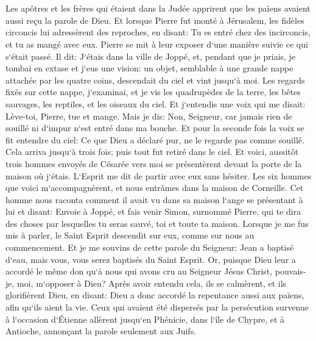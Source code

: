 \chapter{}

\verse Les apôtres et les frères qui étaient dans la Judée apprirent que les païens avaient aussi reçu la parole de Dieu. 
\verse Et lorsque Pierre fut monté à Jérusalem, les fidèles circoncis lui adressèrent des reproches, 
\verse en disant: Tu es entré chez des incirconcis, et tu as mangé avec eux. 
\verse Pierre se mit à leur exposer d`une manière suivie ce qui s`était passé. 
\verse Il dit: J`étais dans la ville de Joppé, et, pendant que je priais, je tombai en extase et j`eus une vision: un objet, semblable à une grande nappe attachée par les quatre coins, descendait du ciel et vint jusqu`à moi. 
\verse Les regards fixés sur cette nappe, j`examinai, et je vis les quadrupèdes de la terre, les bêtes sauvages, les reptiles, et les oiseaux du ciel. 
\verse Et j`entendis une voix qui me disait: Lève-toi, Pierre, tue et mange. 
\verse Mais je dis: Non, Seigneur, car jamais rien de souillé ni d`impur n`est entré dans ma bouche. 
\verse Et pour la seconde fois la voix se fit entendre du ciel: Ce que Dieu a déclaré pur, ne le regarde pas comme souillé. 
\verse Cela arriva jusqu`à trois fois; puis tout fut retiré dans le ciel. 
\verse Et voici, aussitôt trois hommes envoyés de Césarée vers moi se présentèrent devant la porte de la maison où j`étais. 
\verse L`Esprit me dit de partir avec eux sans hésiter. Les six hommes que voici m`accompagnèrent, et nous entrâmes dans la maison de Corneille. 
\verse Cet homme nous raconta comment il avait vu dans sa maison l`ange se présentant à lui et disant: Envoie à Joppé, et fais venir Simon, surnommé Pierre, 
\verse qui te dira des choses par lesquelles tu seras sauvé, toi et toute ta maison. 
\verse Lorsque je me fus mis à parler, le Saint Esprit descendit sur eux, comme sur nous au commencement. 
\verse Et je me souvins de cette parole du Seigneur: Jean a baptisé d`eau, mais vous, vous serez baptisés du Saint Esprit. 
\verse Or, puisque Dieu leur a accordé le même don qu`à nous qui avons cru au Seigneur Jésus Christ, pouvais-je, moi, m`opposer à Dieu? 
\verse Après avoir entendu cela, ils se calmèrent, et ils glorifièrent Dieu, en disant: Dieu a donc accordé la repentance aussi aux païens, afin qu`ils aient la vie. 
\verse Ceux qui avaient été dispersés par la persécution survenue à l`occasion d`Étienne allèrent jusqu`en Phénicie, dans l`île de Chypre, et à Antioche, annonçant la parole seulement aux Juifs. 
